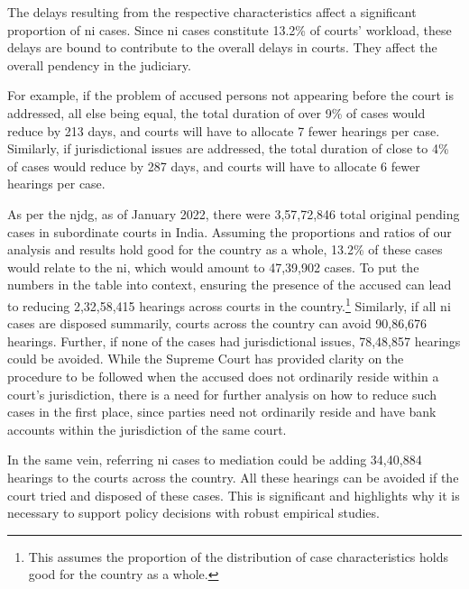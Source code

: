 \documentclass[12pt,a4paper]{article}
\begin{document}
The delays resulting from the respective characteristics affect a significant proportion of \gls{ni} cases. Since \gls{ni} cases constitute 13.2\% of courts' workload, these delays are bound to contribute to the overall delays in courts. They affect the overall pendency in the judiciary. 

For example, if the problem of accused persons not appearing before the court is addressed, all else being equal, the total duration of over 9\% of cases would reduce by 213 days, and courts will have to allocate 7 fewer hearings per case. Similarly, if jurisdictional issues are addressed, the total duration of close to 4\% of cases would reduce by 287 days, and courts will have to allocate 6 fewer hearings per case.

As per the \gls{njdg}, as of January 2022, there were 3,57,72,846 total original pending cases in subordinate courts in India. Assuming the proportions and ratios of our analysis and results hold good for the country as a whole, 13.2\% of these cases would relate to the \gls{ni}, which would amount to 47,39,902 cases. To put the numbers in the table into context, ensuring the presence of the accused can lead to reducing 2,32,58,415 hearings across courts in the country.\footnote{This assumes the proportion of the distribution of case characteristics holds good for the country as a whole.} Similarly, if all \gls{ni} cases are disposed summarily, courts across the country can avoid 90,86,676 hearings. Further, if none of the cases had jurisdictional issues, 78,48,857 hearings could be avoided. While the Supreme Court has provided clarity on the procedure to be followed when the accused does not ordinarily reside within a court's jurisdiction, there is a need for further analysis on how to reduce such cases in the first place, since parties need not ordinarily reside and have bank accounts within the jurisdiction of the same court.

In the same vein, referring \gls{ni} cases to mediation could be adding 34,40,884 hearings to the courts across the country. All these hearings can be avoided if the court tried and disposed of these cases. This is significant and highlights why it is necessary to support policy decisions with robust empirical studies.
\end{document}
